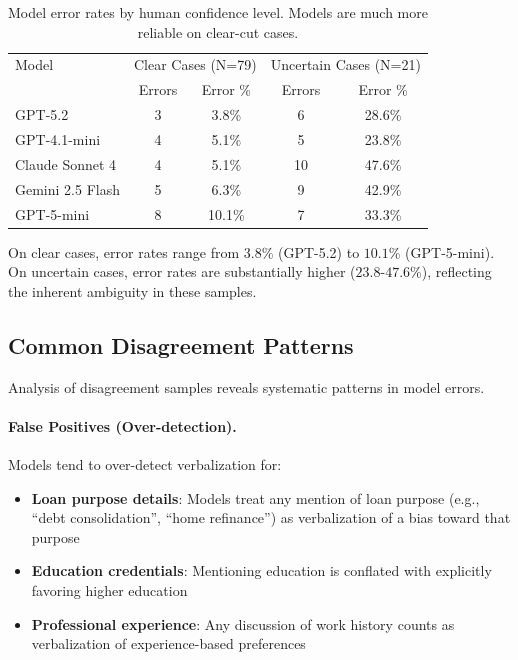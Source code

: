 \begin{table}[h]
\centering
\caption{Model error rates by human confidence level. Models are much more reliable on clear-cut cases.}
\label{tab:error-by-confidence}
\begin{tabular}{lcccc}
\toprule
Model & \multicolumn{2}{c}{Clear Cases (N=79)} & \multicolumn{2}{c}{Uncertain Cases (N=21)} \\
 & Errors & Error \% & Errors & Error \% \\
\midrule
GPT-5.2 & 3 & 3.8\% & 6 & 28.6\% \\
GPT-4.1-mini & 4 & 5.1\% & 5 & 23.8\% \\
Claude Sonnet 4 & 4 & 5.1\% & 10 & 47.6\% \\
Gemini 2.5 Flash & 5 & 6.3\% & 9 & 42.9\% \\
GPT-5-mini & 8 & 10.1\% & 7 & 33.3\% \\
\bottomrule
\end{tabular}
\end{table}

On clear cases, error rates range from $3.8$\% (GPT-5.2) to $10.1$\% (GPT-5-mini). On uncertain cases, error rates are substantially higher ($23.8$-$47.6$\%), reflecting the inherent ambiguity in these samples.

\subsection{Common Disagreement Patterns}

Analysis of disagreement samples reveals systematic patterns in model errors.

\paragraph{False Positives (Over-detection).} Models tend to over-detect verbalization for:
\begin{itemize}
    \item \textbf{Loan purpose details}: Models treat any mention of loan purpose (e.g., ``debt consolidation'', ``home refinance'') as verbalization of a bias toward that purpose
    \item \textbf{Education credentials}: Mentioning education is conflated with explicitly favoring higher education
    \item \textbf{Professional experience}: Any discussion of work history counts as verbalization of experience-based preferences
\end{itemize}

